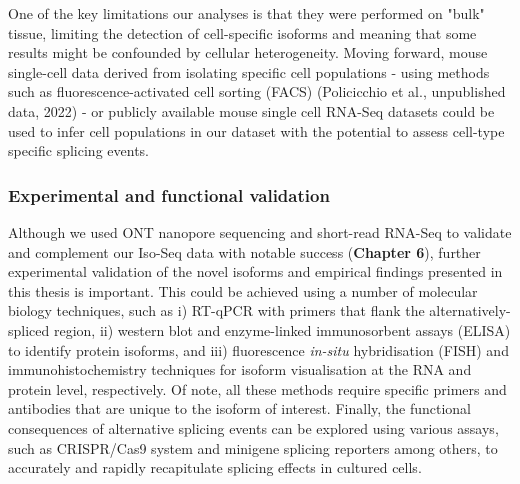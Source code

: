 One of the key limitations our analyses is that they were performed on "bulk" tissue, limiting the detection of cell-specific isoforms and meaning that some results might be confounded by cellular heterogeneity. Moving forward, mouse single-cell data derived from isolating specific cell populations - using methods such as fluorescence-activated cell sorting (FACS) (Policicchio  et al., unpublished data, 2022) - or publicly available mouse single cell RNA-Seq datasets could be used to infer cell populations in our dataset with the potential to assess cell-type specific splicing events.   

\subsubsection{Experimental and functional validation}
Although we used ONT nanopore sequencing and short-read RNA-Seq to validate and complement our Iso-Seq data with notable success (\textbf{Chapter 6}), further experimental validation of the novel isoforms and empirical findings presented in this thesis is important. This could be achieved using a number of molecular biology techniques, such as i) RT-qPCR with primers that flank the alternatively-spliced region, ii) western blot and enzyme-linked immunosorbent assays (ELISA) to identify protein isoforms, and iii) fluorescence \textit{in-situ} hybridisation (FISH) and immunohistochemistry techniques for isoform visualisation at the RNA and protein level, respectively. Of note, all these methods require specific primers and antibodies that are unique to the isoform of interest. Finally, the functional consequences of alternative splicing events can be explored using various assays, such as CRISPR/Cas9 system and minigene splicing reporters among others, to accurately and rapidly recapitulate splicing effects in cultured cells.  


